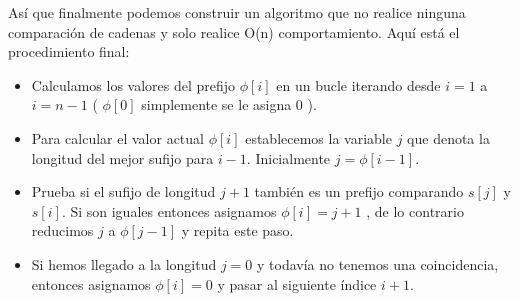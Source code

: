 Así que finalmente podemos construir un algoritmo que no realice ninguna comparación de cadenas y solo realice O(n) comportamiento. Aquí está el procedimiento final:

\begin{itemize}
	\item Calculamos los valores del prefijo $\phi[i]$ en un bucle iterando desde $i = 1$ a $i = n-1$ ( $\phi[0]$ simplemente se le asigna 0 ).
	\item Para calcular el valor actual $\phi[i]$ establecemos la variable $j$ que denota la longitud del mejor sufijo para $i-1$. Inicialmente $j = \phi[i-1]$.
	\item Prueba si el sufijo de longitud $j+1$ también es un prefijo comparando $s[j]$ y $s[i]$. Si son iguales entonces asignamos $\phi[i] = j + 1$ , de lo contrario reducimos $j$ a $\phi[j-1]$ y repita este paso.
	\item  Si hemos llegado a la longitud $j = 0$ y todavía no tenemos una coincidencia, entonces asignamos $\phi[i] = 0$ y pasar al siguiente índice $i + 1$.
\end{itemize}